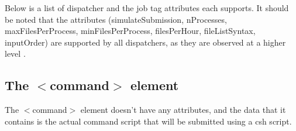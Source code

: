 Below is a list of dispatcher and the job tag attributes each supports.
It should be noted that the attributes (simulateSubmission, nProcesses, maxFilesPerProcess, minFilesPerProcess, filesPerHour, fileListSyntax, inputOrder) are supported by all dispatchers,
as they are observed at a higher level \starScheduler.

\subsection{The $<$command$>$ element}
The $<$command$>$ element doesn't have any attributes, and the data that it contains is the actual command script that will be submitted using a csh script.
